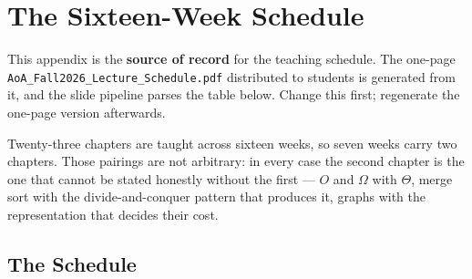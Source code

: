 \chapter{The Sixteen-Week Schedule}\label{app:schedule}
\normalfigures

This appendix is the \textbf{source of record} for the teaching schedule. The
one-page \texttt{AoA\_Fall2026\_Lecture\_Schedule.pdf} distributed to students
is generated from it, and the slide pipeline parses the table below. Change
this first; regenerate the one-page version afterwards.

Twenty-three chapters are taught across sixteen weeks, so seven weeks carry two
chapters. Those pairings are not arbitrary: in every case the second chapter is
the one that cannot be stated honestly without the first --- $O$ and $\Omega$
with $\Theta$, merge sort with the divide-and-conquer pattern that produces it,
graphs with the representation that decides their cost.

\section{The Schedule}

